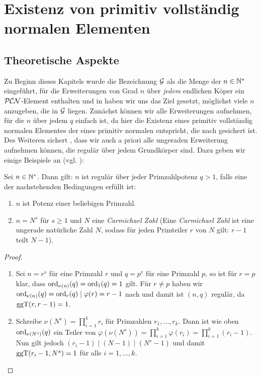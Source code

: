 \section{Existenz von primitiv vollständig normalen Elementen}

\subsection{Theoretische Aspekte}

Zu Beginn dieses Kapitels wurde die Bezeichnung $\mathcal{G}$ als die Menge der
$n\in \mathbb{N}^\ast$ eingeführt, für die Erweiterungen von Grad $n$ über \emph{jedem}
endlichen Köper ein $\mathcal{PCN}$-Element enthalten und in
 haben wir uns das Ziel gesetzt, möglichst viele $n$
anzugeben, die in $\mathcal{G}$ liegen. Zunächst können wir alle Erweiterungen
aufnehmen, für die $n$ über jedem $q$ einfach ist,
da hier die Existenz eines primitiv vollständig normalen Elementes
der eines primitiv normalen entspricht, die nach 
 gesichert ist. 
Des Weiteren sichert , dass wir auch 
a priori alle ungeraden Erweiterung aufnehmen können, die regulär über jedem
Grundkörper sind. Dazu geben wir einige Beispiele an 
(vgl. \autocite[Abschnitt vor Section 2]{hachenberger2001}):

\begin{lemma}
  \label{lemma:regular_speziell}
  Sei $n \in \mathbb{N}^\ast$. Dann gilt: $n$ ist regulär
  über jeder Primzahlpotenz $q>1$, falls eine der nachstehenden
  Bedingungen erfüllt ist:
  \begin{enumerate}
    \item $n$ ist Potenz einer beliebigen Primzahl.
    \item $n = N^s$ für $s\geq 1$ und $N$ eine 
      \emph{Carmichael Zahl} (Eine \emph{Carmichael Zahl} ist eine ungerade
      natürliche Zahl $N$, sodass für jeden Primteiler $r$ von $N$ gilt: 
      $r-1$ teilt $N-1$).
  \end{enumerate}
\end{lemma}
\begin{proof}
  \begin{enumerate}
    \item Sei $n = r^s$ für eine Primzahl $r$ und 
      $q = p^e$ für eine Primzahl $p$, so ist für  $r=p$ klar,
      dass $\operatorname{ord}_{\nu(n)}(q) = \operatorname{ord}_{1}(q)=1$ gilt. Für $r \neq p$ haben wir
      $\operatorname{ord}_{\nu(n)}(q) = \operatorname{ord}_r(q) \mid \varphi(r) = r-1$ nach
       und damit ist $(n,q)$ regulär, da
      $\operatorname{ggT}(r,r-1) = 1$.
    \item Schreibe $\nu(N^s) = \prod_{i=1}^k r_i$ für Primzahlen 
      $r_1,\ldots,r_k$. Dann ist wie oben $\operatorname{ord}_{\nu(N^s)}(q)$ ein
      Teiler von $\varphi(\nu(N^s)) = \prod_{i=1}^k\varphi(r_i) = 
      \prod_{i=1}^k (r_i-1)$. Nun gilt jedoch $(r_i-1) \mid (N-1) \mid (N^s-1)$
      und damit $\operatorname{ggT}(r_i-1, N^s) = 1$ für alle $i=1,\ldots,k$.
  \end{enumerate}
\end{proof}


